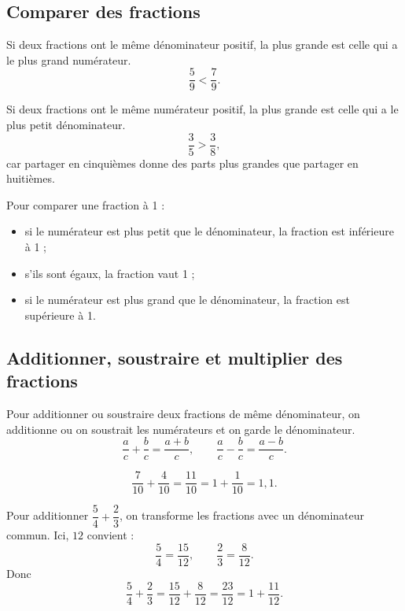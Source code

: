 \documentclass[11pt,a4paper]{article}
\begin{document}
\subsection{Comparer des fractions}

\begin{proprbox}
Si deux fractions ont le même dénominateur positif, la plus grande est celle qui a le plus grand numérateur.
\[
\frac{5}{9}<\frac{7}{9}.
\]
\end{proprbox}

\begin{proprbox}
Si deux fractions ont le même numérateur positif, la plus grande est celle qui a le plus petit dénominateur.
\[
\frac{3}{5}>\frac{3}{8},
\]
car partager en cinquièmes donne des parts plus grandes que partager en huitièmes.
\end{proprbox}

\begin{methodbox}
Pour comparer une fraction à 1 :
\begin{itemize}
\item si le numérateur est plus petit que le dénominateur, la fraction est inférieure à 1 ;
\item s'ils sont égaux, la fraction vaut 1 ;
\item si le numérateur est plus grand que le dénominateur, la fraction est supérieure à 1.
\end{itemize}
\end{methodbox}

\subsection{Additionner, soustraire et multiplier des fractions}

\begin{proprbox}
Pour additionner ou soustraire deux fractions de même dénominateur, on additionne ou on soustrait les numérateurs et on garde le dénominateur.
\[
\frac{a}{c}+\frac{b}{c}=\frac{a+b}{c}, \qquad \frac{a}{c}-\frac{b}{c}=\frac{a-b}{c}.
\]
\end{proprbox}

\begin{exemplebox}
\[
\frac{7}{10}+\frac{4}{10}=\frac{11}{10}=1+\frac{1}{10}=1,1.
\]
\end{exemplebox}

\begin{methodbox}
Pour additionner \(\dfrac{5}{4}+\dfrac{2}{3}\), on transforme les fractions avec un dénominateur commun. Ici, \(12\) convient :
\[
\frac{5}{4}=\frac{15}{12}, \qquad \frac{2}{3}=\frac{8}{12}.
\]
Donc
\[
\frac{5}{4}+\frac{2}{3}=\frac{15}{12}+\frac{8}{12}=\frac{23}{12}=1+\frac{11}{12}.
\]
\end{methodbox}
\end{document}
